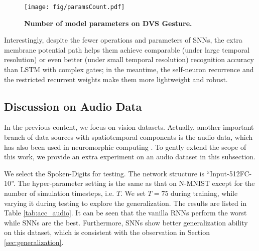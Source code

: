 \documentclass[journal,10pt,twocolumn]{IEEETran}
\begin{document}
\begin{figure}[!htbp]
\centering     
\texttt{[image: fig/paramsCount.pdf]}
\caption{\textbf{Number of model parameters on DVS Gesture.}} \label{fig:parameters} 
\end{figure}

Interestingly, despite the fewer operations and parameters of SNNs, the extra membrane potential path helps them achieve comparable (under large temporal resolution) or even better (under small temporal resolution) recognition accuracy than LSTM with complex gates; in the meantime, the self-neuron recurrence and the restricted recurrent weights make them more lightweight and robust.


\subsection{Discussion on Audio Data}

In the previous content, we focus on vision datasets. Actually, another important branch of data sources with spatiotemporal components is the audio data, which has also been used in neuromorphic computing \cite{wu2018spiking, wu2020deep}. To gently extend the scope of this work, we provide an extra experiment on an audio dataset in this subsection. 

\begin{table}[!htbp]
\caption{Accuracy results on audio data.}
\label{tab:acc_audio}
\vspace{2pt}
\centering
\renewcommand\arraystretch{1.3}
\end{table}

We select the Spoken-Digits \cite{Dua:2019} for testing. The network structure is ``Input-512FC-10''. The hyper-parameter setting is the same as that on N-MNIST except for the number of simulation timesteps, i.e. $T$. We set $T=75$ during training, while varying it during testing to explore the generalization. The results are listed in Table \ref{tab:acc_audio}. It can be seen that the vanilla RNNs perform the worst while SNNs are the best. Furthermore, SNNs show better generalization ability on this dataset, which is consistent with the observation in Section \ref{sec:generalization}.
\end{document}
